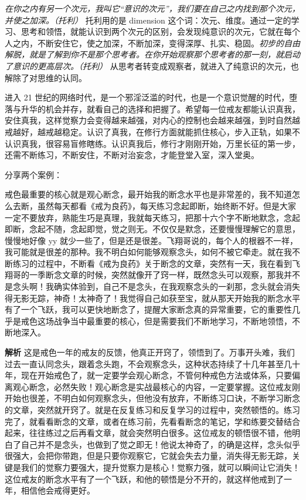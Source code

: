\textit{在你之内有另一个次元，我叫它“意识的次元”，我们要在自己之内找到那个次元，并使之加深。（托利）} 托利用的是 dimension 这个词：次元、维度。通过一定的学习、思考和领悟，就能认识到两个次元的区别，会发现纯意识的次元，它就在每个人之内，不断安住它，使之加深，不断加深，变得深厚、扎实、稳固。\textit{初步的自由解脱，就是了解到你不是那个思考者。在你开始观察那个思考者的那一刻，就启动了意识的更高层次。（托利）} 从思考者转变成观察者，就进入了纯意识的次元，也解除了对思维的认同。

进入 21 世纪的网络时代，是一个邪淫泛滥的时代，也是一个意识觉醒的时代，堕落与升华的机会并存，就看自己的选择和把握了。希望每一位戒友都能认识真我，安住真我，这样觉察力会变得越来越强，对内心的控制也会越来越强，到时自然越戒越好，越戒越稳定。认识了真我，在修行方面就能抓住核心，步入正轨，如果不认识真我，很容易盲修瞎练。认识真我后，修行才刚刚开始，万里长征的第一步，还需不断练习，不断安住，不断对治妄念，才能登堂入室，深入堂奥。

分享两个案例：

\begin{case}
    戒色最重要的核心就是观心断念，最开始我的断念水平也是非常差的，我不知道怎么去断，虽然每天都看《戒为良药》，每天练习念起即断，始终断不好。但是大家一定不要放弃，熟能生巧是真理，我就每天练习，把那十六个字不断地默念，念起即断，念起不随，念起即觉，觉之则无。不仅仅是默念，还要慢慢理解它的意思，慢慢地好像 yy 就少一些了，但是还是很差。飞翔哥说的，每个人的根器不一祥，我可能就是很差的那种。我不明白如何能够观察念头，如何不被它牵走。就在我不断练习的过程中，不断看《戒为良药》关于断念的文章，突然有一天，我在看到飞翔哥的一季断念文章的时候，突然就像开了窍一样，既然念头可以观察，那我并不是念头啊！我确实体验到，自己不是念头，在我观察念头的一刹那，念头就会消失得无影无踪，神奇！太神奇了！我觉得自己如获至宝，就从那天开始我的断念水平有了一个飞跃，我可以更快地断念了，提醒大家断念真的异常重要，它的重要性几乎是戒色这场战争当中最重要的核心，但是需要我们不断地学习，不断地领悟，不断地深入。

    \textbf{解析} 这是戒色一年的戒友的反馈，他真正开窍了，领悟到了。万事开头难，我们过去一直认同念头，跟着念头跑，不会观察念头，这种状态持续了十几年甚至几十年，现在开始戒色了，就一定要学会观心断念，不管何种戒色方法或体系，只要偏离观心断念，必然失败！观心断念是实战最核心的内容，一定要掌握。这位戒友刚开始也很差，不明白如何观察念头，但他没有放弃，不断练习口诀，不断学习断念的文章，突然就开窍了。就是在反复练习和反复学习的过程中，突然顿悟的。练习完了，就看看断念的文章，或者在练习前，先看看断念的笔记，学和练要交替结合起来，往往练过之后再看文章，就会突然明白很多。这位戒友的顿悟很不错，他明白了自己并不是念头，也做到了觉之即无！他说太神奇了，的确是这样，念头似乎很强大，会把你带跑，但是只要你观察它，它就会失去力量，消失得无影无踪，关键是我们的觉察力要强大，提升觉察力是核心！觉察力强，就可以瞬间让它消失！这位戒友的断念水平有了一个飞跃，和他的顿悟是分不开的，就这样他戒到了一年，相信他会戒得更好。
\end{case}

